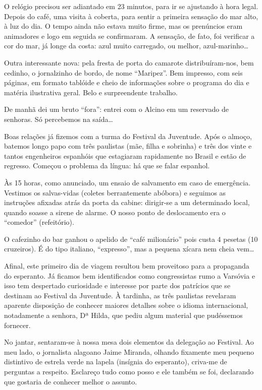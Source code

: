 O relógio precisou ser adiantado em 23 minutos, para ir se ajustando à hora legal. Depois do café, uma visita à coberta, para sentir a primeira sensação do mar alto, à luz do dia. O tempo ainda não estava muito firme, mas os prenúncios eram animadores e logo em seguida se confirmaram. A sensação, de fato, foi verificar a cor do mar, já longe da costa: azul muito carregado, ou melhor, azul-marinho\ldots

Outra interessante nova: pela fresta de porta do camarote distribuíram-nos, bem cedinho, o jornalzinho de bordo, de nome ``Maripez''. Bem impresso, com seis páginas, em formato tablóide e cheio de informações sobre o programa do dia e matéria ilustrativa geral. Belo e surpreendente trabalho.

De manhã dei um bruto ``fora'': entrei com o Alcino em um reservado de senhoras. Só percebemos na saída\ldots

Boas relações já fizemos com a turma do Festival da Juventude. Após o almoço, batemos longo papo com três paulistas (mãe, filha e sobrinha) e três dos vinte e tantos engenheiros espanhóis que estagiaram rapidamente no Brasil e estão de regresso. Começou o problema da língua: há que se falar espanhol.

Às 15 horas, como anunciado, um ensaio de salvamento em caso de emergência. Vestimos os salvas-vidas (coletes berrantemente abóbora) e seguimos as instruções afixadas atrás da porta da cabine: dirigir-se a um determinado local, quando soasse a sirene de alarme. O nosso ponto de deslocamento era o ``comedor'' (refeitório).

O cafezinho do bar ganhou o apelido de ``café milionário'' pois custa 4 pesetas (10 cruzeiros). É do tipo italiano, ``expresso'', mas a pequena xícara nem cheia vem\ldots

Afinal, este primeiro dia de viagem resultou bem proveitoso para a propaganda do esperanto. Já ficamos bem identificados como congressistas rumo a Varsóvia e isso tem despertado curiosidade e interesse por parte dos patrícios que se destinam ao Festival da Juventude. À tardinha, as três paulistas revelaram aparente disposição de conhecer maiores detalhes sobre o idioma internacional, notadamente a senhora, Dª Hilda, que pediu algum material que pudéssemos fornecer.

No jantar, sentaram-se à nossa mesa dois elementos da delegação ao Festival. Ao meu lado, o jornalista alagoano Jaime Miranda, olhando fixamente meu pequeno distintivo de estrela verde na lapela (insígnia do esperanto), criva-me de perguntas a respeito. Esclareço tudo como posso e ele também se foi, declarando que gostaria de conhecer melhor o assunto.


